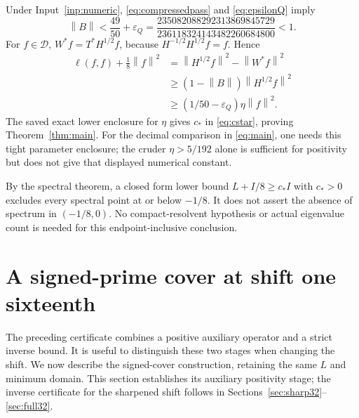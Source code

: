 \documentclass[11pt,a4paper]{article}
\numberwithin{equation}{section}
\theoremstyle{definition}\newtheorem{definition}[theorem]{Definition}
\theoremstyle{remark}\newtheorem{remark}[theorem]{Remark}
\newcommand{\DD}{\mathcal D}
\newcommand{\norm}[1]{\left\|#1\right\|}
\newcommand{\epsQ}{\varepsilon_Q}
\begin{document}
Under Input~\ref{inp:numeric}, \eqref{eq:compressedpass} and \eqref{eq:epsilonQ} imply
\begin{equation}\label{eq:fullB}
 \norm B<\frac{49}{50}+\epsQ
 =\frac{235082088292313869845729}{236118324143482260684800}<1.
\end{equation}
For $f\in\DD$, $W^*f=T^*H^{1/2}f$, because $H^{-1/2}H^{1/2}f=f$. Hence
\begin{align}\label{eq:consumer}
 \ell(f,f)+\tfrac18\norm f^2
 &=\norm{H^{1/2}f}^2-\norm{W^*f}^2\nonumber\\
 &\ge(1-\norm B)\norm{H^{1/2}f}^2\nonumber\\
 &\ge(1/50-\epsQ)\eta\norm f^2.
\end{align}
The saved exact lower enclosure for $\eta$ gives $c_*$ in \eqref{eq:cstar}, proving Theorem~\ref{thm:main}. For the decimal comparison in \eqref{eq:main}, one needs this tight parameter enclosure; the cruder $\eta>5/192$ alone is sufficient for positivity but does not give that displayed numerical constant.

By the spectral theorem, a closed form lower bound $L+I/8\ge c_*I$ with $c_*>0$ excludes every spectral point at or below $-1/8$. It does not assert the absence of spectrum in $(-1/8,0)$. No compact-resolvent hypothesis or actual eigenvalue count is needed for this endpoint-inclusive conclusion.

\section{A signed-prime cover at shift one sixteenth}\label{sec:signed}
The preceding certificate combines a positive auxiliary operator and a strict inverse bound. It is useful to distinguish these two stages when changing the shift. We now describe the signed-cover construction, retaining the same $L$ and minimum domain. This section establishes its auxiliary positivity stage; the inverse certificate for the sharpened shift follows in Sections~\ref{sec:sharp32}--\ref{sec:full32}.
\end{document}
